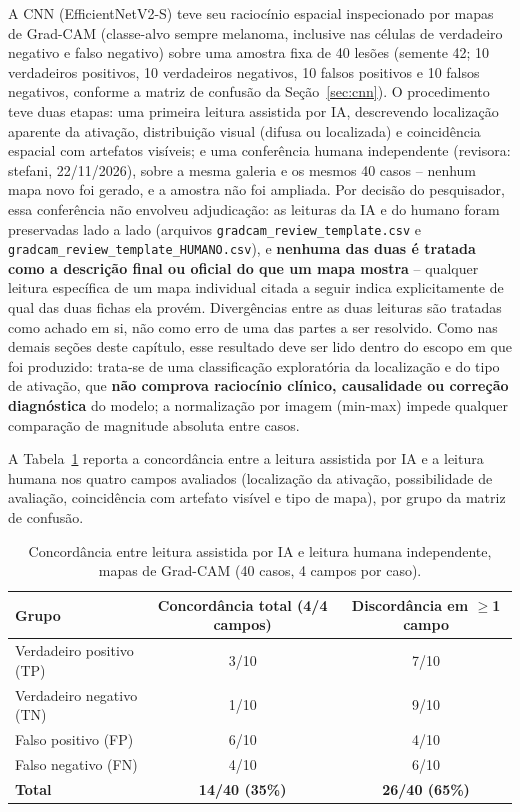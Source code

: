 A CNN (EfficientNetV2-S) teve seu raciocínio espacial inspecionado por mapas de Grad-CAM (classe-alvo sempre melanoma, inclusive nas células de verdadeiro negativo e falso negativo) sobre uma amostra fixa de 40 lesões (semente 42; 10 verdadeiros positivos, 10 verdadeiros negativos, 10 falsos positivos e 10 falsos negativos, conforme a matriz de confusão da Seção~\ref{sec:cnn}). O procedimento teve duas etapas: uma primeira leitura assistida por IA, descrevendo localização aparente da ativação, distribuição visual (difusa ou localizada) e coincidência espacial com artefatos visíveis; e uma conferência humana independente (revisora: stefani, 22/11/2026), sobre a mesma galeria e os mesmos 40 casos -- nenhum mapa novo foi gerado, e a amostra não foi ampliada. Por decisão do pesquisador, essa conferência não envolveu adjudicação: as leituras da IA e do humano foram preservadas lado a lado (arquivos \texttt{gradcam\_review\_template.csv} e \texttt{gradcam\_review\_template\_HUMANO.csv}), e \textbf{nenhuma das duas é tratada como a descrição final ou oficial do que um mapa mostra} -- qualquer leitura específica de um mapa individual citada a seguir indica explicitamente de qual das duas fichas ela provém. Divergências entre as duas leituras são tratadas como achado em si, não como erro de uma das partes a ser resolvido. Como nas demais seções deste capítulo, esse resultado deve ser lido dentro do escopo em que foi produzido: trata-se de uma classificação exploratória da localização e do tipo de ativação, que \textbf{não comprova raciocínio clínico, causalidade ou correção diagnóstica} do modelo; a normalização por imagem (min-max) impede qualquer comparação de magnitude absoluta entre casos.

A Tabela~\ref{tab:gradcam_concordancia} reporta a concordância entre a leitura assistida por IA e a leitura humana nos quatro campos avaliados (localização da ativação, possibilidade de avaliação, coincidência com artefato visível e tipo de mapa), por grupo da matriz de confusão.

\begin{table}[H]
	\centering
	\caption{Concordância entre leitura assistida por IA e leitura humana independente, mapas de Grad-CAM (40 casos, 4 campos por caso).}
	\label{tab:gradcam_concordancia}
	\begin{tabular}{lcc}
		\hline
		\textbf{Grupo} & \textbf{Concordância total (4/4 campos)} & \textbf{Discordância em $\geq$1 campo} \\
		\hline
		Verdadeiro positivo (TP) & 3/10 & 7/10 \\
		Verdadeiro negativo (TN) & 1/10 & 9/10 \\
		Falso positivo (FP) & 6/10 & 4/10 \\
		Falso negativo (FN) & 4/10 & 6/10 \\
		\hline
		\textbf{Total} & \textbf{14/40 (35\%)} & \textbf{26/40 (65\%)} \\
		\hline
	\end{tabular}
\end{table}

